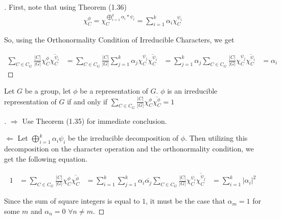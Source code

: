 \noindent \begin{proof}[\cite{Tung}] First, note that using Theorem (1.36)
\begin{equation}
	\begin{aligned}
		\chi^\phi_C = \chi^{ \bigoplus_{i=1}^k \alpha_i *\psi_i}_C = \sum_{i=1}^k \alpha_i \chi^{\psi_i}_C
	\end{aligned}
\end{equation}

So, using the Orthonormality Condition of Irreducible Characters, we get 

\begin{equation}
	\begin{aligned}
\sum_{C\in C_G} \frac{|C|}{|G|}\chi^\phi_C \overline{\chi^{\psi_i}_C} &= \sum_{C\in C_G} \frac{|C|}{|G|} \sum_{j=1}^k \alpha_j \chi^{\psi_j}_C \overline{\chi^{\psi_i}_C} &= \sum_{j=1}^k \alpha_j \sum_{C\in C_G} \frac{|C|}{|G|} \chi^{\psi_j}_C \overline{\chi^{\psi_i}_C}  &= \alpha_i 
	\end{aligned}
\end{equation}
\end{proof}

\begin{theorem}
	Let $G$ be a group, let $\phi$ be a representation of $G$. $\phi$ is an irreducible representation of $G$ if and only if $\sum_{C\in C_G} \frac{|C|}{|G|}\chi^\phi_C \overline{\chi^\phi_C} = 1$
\end{theorem}

\noindent \begin{proof}[\cite{Tung}] $\Rightarrow$ Use Theorem (1.35) for immediate conclusion. 

\hspace{2mm}$\Leftarrow$ Let $\bigoplus_{i=1}^k \alpha_i\psi_i$ be the irreducible decomposition of $\phi$. Then utilizing this decomposition on the character operation and the orthonormality condition, we get the following equation.

\begin{equation}
	\begin{aligned}
		1 &=\sum_{C\in C_G} \frac{|C|}{|G|}\chi^\phi_C \overline{\chi^\phi_C} &= \sum_{i=1}^k \sum_{j=1}^k \alpha_i \overline{\alpha_j} \sum_{C\in C_G} \frac{|C|}{|G|} \chi^{\psi_i}_C \overline{\chi^{\psi_j}_C} &= \sum_{i=1}^k |\alpha_i|^2
	\end{aligned}
\end{equation}

Since the sum of square integers is equal to $1$, it must be the case that $\alpha_m = 1$ for some $m$ and $\alpha_n=0$  $\forall n \neq m$.  \end{proof}


